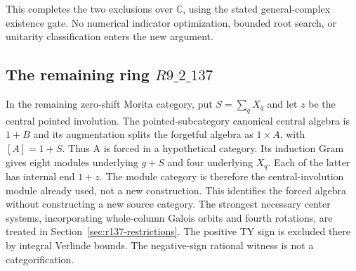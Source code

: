 This completes the two exclusions over \(\mathbb C\), using the stated
general-complex existence gate. No numerical indicator optimization,
bounded root search, or unitarity classification enters the new
argument.

\subsection{The remaining ring $R9\_2\_137$}
In the remaining zero-shift Morita category, put $S=\sum_q X_q$ and let
$z$ be the central pointed involution. The pointed-subcategory canonical
central algebra is $1+B$ and its augmentation splits the forgetful algebra
as $1\times A$, with $[A]=1+S$. Thus A is forced in a hypothetical category.
Its induction Gram gives eight modules underlying $g+S$ and four underlying
$X_q$. Each of the latter has internal end $1+z$. The module category is
therefore the central-involution module already used, not a new construction.
This identifies the forced algebra without constructing a new source category.
The strongest necessary center systems, incorporating whole-column Galois
orbits and fourth rotations, are treated in Section~\ref{sec:r137-restrictions}.
The positive TY sign is excluded there by integral Verlinde bounds. The negative-sign rational witness is not a categorification.

